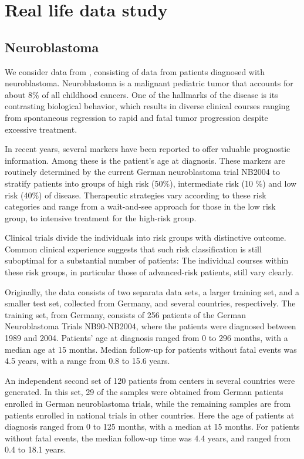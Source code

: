 \chapter{Real life data study}

\section{Neuroblastoma}
We consider data from \citet{oberthuer-data}, consisting of data from patients diagnosed with neuroblastoma.
Neuroblastoma is a malignant pediatric tumor that accounts for about 8\% of all childhood cancers.
One of the hallmarks of the disease is its contrasting biological behavior, which results in diverse clinical courses ranging from spontaneous regression to rapid and fatal tumor progression despite excessive treatment.

In recent years, several markers have been reported to offer valuable prognostic information.
Among these is the patient's age at diagnosis.
These markers are routinely determined by the current German neuroblastoma trial NB2004 to stratify patients into groups of high risk (50\%),
intermediate risk (10 \%) and low risk (40\%) of disease.
Therapeutic strategies vary according to these risk categories and range from a wait-and-see approach for those in the low risk group,
to intensive treatment for the high-risk group.

Clinical trials divide the individuals into risk groups with distinctive outcome.
Common clinical experience suggests that such risk classification is still suboptimal for a substantial number of patients:
The individual courses within these risk groups,
in particular those of advanced-risk patients, still vary clearly.

Originally, the data consists of two separata data sets, a larger training set, and a smaller test set, collected from Germany, and several countries, respectively.
The training set, from Germany, consists of 256 patients of the German Neuroblastoma Trials NB90-NB2004, where the patients were diagnosed between 1989 and 2004.
Patients' age at diagnosis ranged from 0 to 296 months, with a median age at 15 months.
Median follow-up for patients without fatal events was 4.5 years, with a range from 0.8 to 15.6 years.

An independent second set of 120 patients from centers in several countries were generated.
In this set, 29 of the samples were obtained from German patients enrolled in German neuroblastoma trials, while the remaining samples are from patients enrolled in national trials in other countries.
Here the age of patients at diagnosis ranged from 0 to 125 months, with a median at 15 months.
For patients without fatal events, the median follow-up time was 4.4 years, and ranged from 0.4 to 18.1 years.

